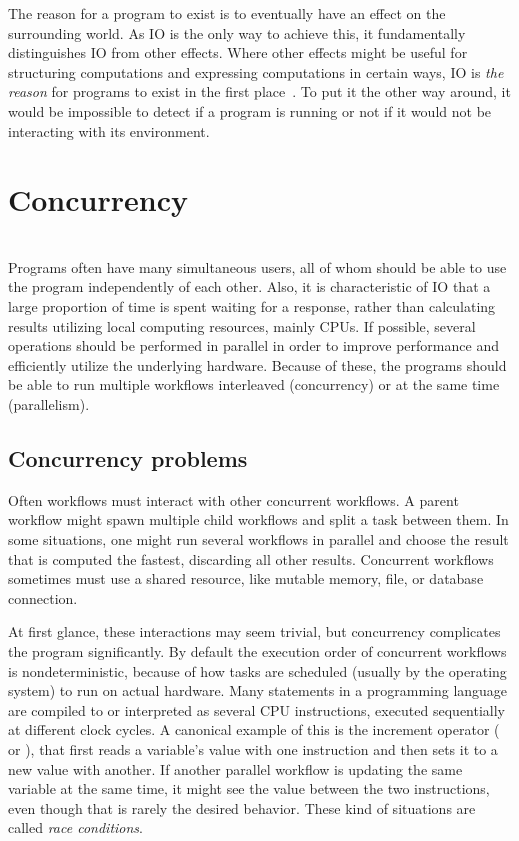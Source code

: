 The reason for a program to exist is to eventually have an effect on the surrounding world. As IO is the only way to achieve this, it fundamentally distinguishes IO from other effects. Where other effects might be useful for structuring computations and expressing computations in certain ways, IO is \emph{the reason} for programs to exist in the first place~\cite{akward-squad}. To put it the other way around, it would be impossible to detect if a program is running or not if it would not be interacting with its environment.





\section{Concurrency}
\\
Programs often have many simultaneous users, all of whom should be able to use the program independently of each other. Also, it is characteristic of IO that a large proportion of time is spent waiting for a response, rather than calculating results utilizing local computing resources, mainly CPUs. If possible, several operations should be performed in parallel in order to improve performance and efficiently utilize the underlying hardware. Because of these, the programs should be able to run multiple workflows interleaved (concurrency) or at the same time (parallelism).


\subsection{Concurrency problems}
Often workflows must interact with other concurrent workflows. A parent workflow might spawn multiple child workflows and split a task between them. In some situations, one might run several workflows in parallel and choose the result that is computed the fastest, discarding all other results. Concurrent workflows sometimes must use a shared resource, like mutable memory, file, or database connection.

At first glance, these interactions may seem trivial, but concurrency complicates the program significantly. By default the execution order of concurrent workflows is nondeterministic, because of how tasks are scheduled (usually by the operating system) to run on actual hardware. Many statements in a programming language are compiled to or interpreted as several CPU instructions, executed sequentially at different clock cycles. A canonical example of this is the increment operator (\inlinecode{++} or \inlinecode{+=}), that first reads a variable's value with one instruction and then sets it to a new value with another. If another parallel workflow is updating the same variable at the same time, it might see the value between the two instructions, even though that is rarely the desired behavior. These kind of situations are called \emph{race conditions}.

